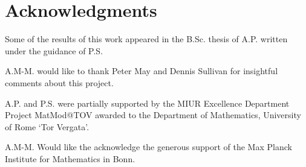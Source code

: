
\section*{Acknowledgments}

Some of the results of this work appeared in the B.Sc. thesis of A.P. written under the guidance of P.S.

A.M-M. would like to thank Peter May and Dennis Sullivan for insightful comments about this project.

A.P. and P.S. were partially supported by the MIUR Excellence Department Project MatMod@TOV awarded to the Department of Mathematics, University of Rome `Tor Vergata'.

A.M-M. Would like the acknowledge the generous support of the Max Planck Institute for Mathematics in Bonn.